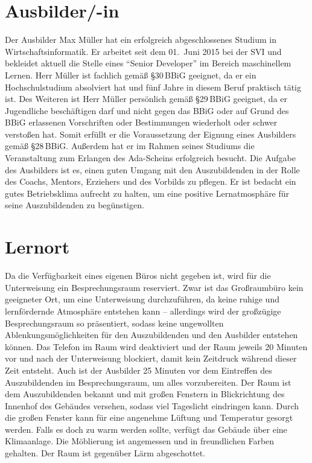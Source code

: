 \section{Ausbilder/-in}
Der Ausbilder Max Müller hat ein erfolgreich abgeschlossenes Studium in Wirtschaftsinformatik. Er arbeitet seit dem 01.~Juni 2015 bei der \ac{SVI} und bekleidet aktuell die Stelle eines \enquote{Senior Developer} im Bereich maschinellem Lernen. Herr Müller ist fachlich gemäß §30\,BBiG geeignet, da er ein Hochschulstudium absolviert hat und fünf Jahre in diesem Beruf praktisch tätig ist. Des Weiteren ist Herr Müller persönlich gemäß §29\,BBiG geeignet, da er Jugendliche beschäftigen darf und nicht gegen das \ac{BBiG} oder auf Grund des \ac{BBiG} erlassenen Vorschriften oder Bestimmungen wiederholt oder schwer verstoßen hat. Somit erfüllt er die Voraussetzung der Eignung eines Ausbilders gemäß §28\,BBiG. Außerdem hat er im Rahmen seines Studiums die Veranstaltung zum Erlangen des Ada-Scheins erfolgreich besucht. Die Aufgabe des Ausbilders ist es, einen guten Umgang mit den Auszubildenden in der Rolle des Coachs, Mentors, Erziehers und des Vorbilds zu pflegen. Er ist bedacht ein gutes Betriebsklima aufrecht zu halten, um eine positive Lernatmosphäre für seine Auszubildenden zu begünstigen.

\section{Lernort}
Da die Verfügbarkeit eines eigenen Büros nicht gegeben ist, wird für die Unterweisung ein Besprechungsraum reserviert. Zwar ist das Großraumbüro kein geeigneter Ort, um eine Unterweisung durchzuführen, da keine ruhige und lernfördernde Atmosphäre entstehen kann -- allerdings wird der großzügige Besprechungsraum so präsentiert, sodass keine ungewollten Ablenkungsmöglichkeiten für den Auszubildenden und den Ausbilder entstehen können. Das Telefon im Raum wird deaktiviert und der Raum jeweils 20 Minuten vor und nach der Unterweisung blockiert, damit kein Zeitdruck während dieser Zeit entsteht. Auch ist der Ausbilder 25 Minuten vor dem Eintreffen des Auszubildenden im Besprechungsraum, um alles vorzubereiten. Der Raum ist dem Auszubildenden bekannt und mit großen Fenstern in Blickrichtung des Innenhof des Gebäudes versehen, sodass viel Tageslicht eindringen kann. Durch die großen Fenster kann für eine angenehme Lüftung und Temperatur gesorgt werden. Falls es doch zu warm werden sollte, verfügt das Gebäude über eine Klimaanlage. Die Möblierung ist angemessen und in freundlichen Farben gehalten. Der Raum ist gegenüber Lärm abgeschottet. 

